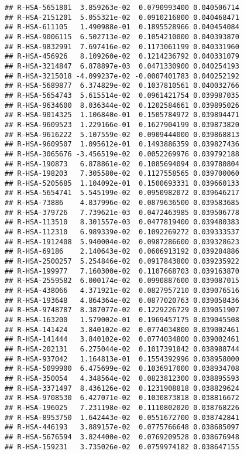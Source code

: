 \documentclass[
]{article}
\begin{document}
\begin{verbatim}
## R-HSA-5651801  3.859263e-02  0.0790993400 0.040506714
## R-HSA-2151201  5.055321e-02  0.0910216800 0.040468471
## R-HSA-611105   1.490988e-01  0.1895528966 0.040454084
## R-HSA-9006115  6.502713e-02  0.1054210000 0.040393870
## R-HSA-9832991  7.697416e-02  0.1173061199 0.040331960
## R-HSA-456926   8.109260e-02  0.1214236792 0.040331079
## R-HSA-3214847  6.878897e-03  0.0471330900 0.040254193
## R-HSA-3215018 -4.099237e-02 -0.0007401783 0.040252192
## R-HSA-5689877  6.374829e-02  0.1037810561 0.040032766
## R-HSA-5654743  5.615514e-02  0.0961421754 0.039987035
## R-HSA-9634600  8.036344e-02  0.1202584661 0.039895026
## R-HSA-9014325  1.106840e-01  0.1505784972 0.039894471
## R-HSA-9609523  1.229166e-01  0.1627904199 0.039873820
## R-HSA-9616222  5.107559e-02  0.0909444000 0.039868813
## R-HSA-9609507  1.095612e-01  0.1493886359 0.039827436
## R-HSA-3065676 -3.456519e-02  0.0052269976 0.039792188
## R-HSA-190873   6.878861e-02  0.1085694094 0.039780804
## R-HSA-198203   7.305580e-02  0.1127558565 0.039700060
## R-HSA-5205685  1.104092e-01  0.1500693331 0.039660133
## R-HSA-5654741  5.545199e-02  0.0950982072 0.039646217
## R-HSA-73886    4.837996e-02  0.0879636500 0.039583685
## R-HSA-379726   7.739621e-03  0.0472463985 0.039506778
## R-HSA-113510   8.301557e-03  0.0477819400 0.039480383
## R-HSA-112310   6.989339e-02  0.1092269272 0.039333537
## R-HSA-1912408  5.940004e-02  0.0987286600 0.039328623
## R-HSA-69186    2.140643e-02  0.0606913192 0.039284886
## R-HSA-2500257  5.254846e-02  0.0917843800 0.039235922
## R-HSA-199977   7.160300e-02  0.1107668703 0.039163870
## R-HSA-2559582  6.000174e-02  0.0990887600 0.039087015
## R-HSA-438066   4.371921e-02  0.0827957210 0.039076516
## R-HSA-193648   4.864364e-02  0.0877020763 0.039058436
## R-HSA-9748787  8.387077e-02  0.1229226729 0.039051907
## R-HSA-163200   1.579002e-01  0.1969457175 0.039045508
## R-HSA-141424   3.840102e-02  0.0774034800 0.039002461
## R-HSA-141444   3.840102e-02  0.0774034800 0.039002461
## R-HSA-202131   6.275044e-02  0.1017391842 0.038988744
## R-HSA-937042   1.164813e-01  0.1554392996 0.038958000
## R-HSA-5099900  6.475699e-02  0.1036917000 0.038934708
## R-HSA-350054   4.348564e-02  0.0823812300 0.038895593
## R-HSA-3371497  8.436126e-02  0.1231908818 0.038829624
## R-HSA-9708530  6.427071e-02  0.1030873818 0.038816672
## R-HSA-196025   7.231198e-02  0.1110802020 0.038768226
## R-HSA-8953750  1.642443e-02  0.0551672700 0.038742841
## R-HSA-446193   3.889157e-02  0.0775766648 0.038685097
## R-HSA-5676594  3.824400e-02  0.0769209528 0.038676948
## R-HSA-159231   3.735026e-02  0.0759974182 0.038647155

\end{verbatim}
\end{document}
